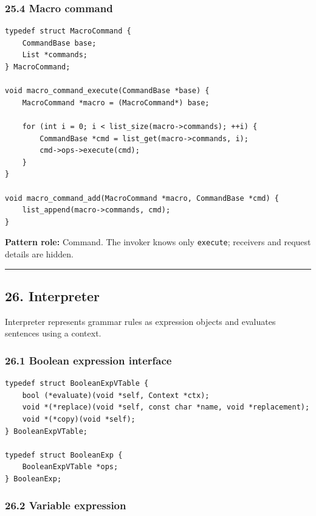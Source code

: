 \documentclass[11pt]{article}
\begin{document}
\subsubsection{25.4 Macro command}\label{macro-command}

\begin{verbatim}
typedef struct MacroCommand {
    CommandBase base;
    List *commands;
} MacroCommand;

void macro_command_execute(CommandBase *base) {
    MacroCommand *macro = (MacroCommand*) base;

    for (int i = 0; i < list_size(macro->commands); ++i) {
        CommandBase *cmd = list_get(macro->commands, i);
        cmd->ops->execute(cmd);
    }
}

void macro_command_add(MacroCommand *macro, CommandBase *cmd) {
    list_append(macro->commands, cmd);
}
\end{verbatim}

\textbf{Pattern role:} Command. The invoker knows only \texttt{execute}; receivers and request details are hidden.

\begin{center}\rule{0.5\linewidth}{0.5pt}\end{center}

\subsection{26. Interpreter}\label{interpreter}

Interpreter represents grammar rules as expression objects and evaluates sentences using a context.

\subsubsection{26.1 Boolean expression interface}\label{boolean-expression-interface}

\begin{verbatim}
typedef struct BooleanExpVTable {
    bool (*evaluate)(void *self, Context *ctx);
    void *(*replace)(void *self, const char *name, void *replacement);
    void *(*copy)(void *self);
} BooleanExpVTable;

typedef struct BooleanExp {
    BooleanExpVTable *ops;
} BooleanExp;
\end{verbatim}

\subsubsection{26.2 Variable expression}\label{variable-expression}
\end{document}
